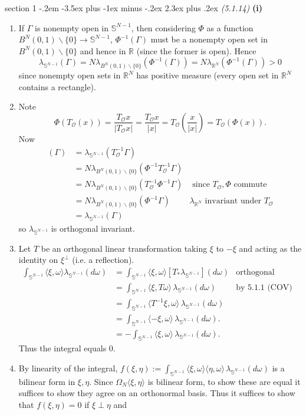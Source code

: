 \documentclass[12pt]{article}
\makeatletter
\theoremstyle{norm}
\newcommand{\bS}[0]{\mathbb{S}}
\newcommand{\sO}[0]{\mathcal{O}}
\newcommand{\R}[0]{\mathbb{R}}
\newcommand{\subeq}[0]{\subseteq}
\newcommand{\Ga}[0]{\Gamma}
\newcommand{\la}[0]{\lambda}
\newcommand{\om}[0]{\omega}
\newcommand{\Om}[0]{\Omega}
\newcommand{\pa}[1]{\left( {#1} \right)}
\newcommand{\an}[1]{\langle {#1}\rangle}
\newcommand{\subprob}[1]{\noindent\textbf{#1}\\}
\newcommand{\pf}[2]{\pa{\frac{#1}{#2}}}
\newcommand{\bs}[0]{\backslash}
\newenvironment{problem}{\@startsection
       {section}
       {1}
       {-.2em}
       {-3.5ex plus -1ex minus -.2ex}
       {2.3ex plus .2ex}
       {\pagebreak[3]%
       \large\bf\noindent{Problem }
       }
       }
       {%
       }
\makeatother
\begin{document}
\begin{problem}{\it (5.1.14)}
\subprob{(i)}
\begin{enumerate}
\item
If $\Ga$ is nonempty open in $\bS^{N-1}$, %
then considering $\Phi$ as a function $B^N(0,1)\bs\{0\}\to \bS^{N-1}$, $\Phi^{-1}(\Ga)$ must be a nonempty open set in $B^N(0,1)\bs\{0\}$ and hence in $\R$ (since the former is open). Hence
\[
\la_{\bS^{N-1}}(\Ga)=N\la_{B^N(0,1)\bs\{0\}}(\Phi^{-1}(\Ga))=N\la_{\R^N}(\Phi^{-1}(\Ga))>0
\]
since nonempty open sets in $\R^N$ has positive measure (every open set in $\R^N$ contains a rectangle).
\item
Note 
\[
\Phi(T_{\sO}(x))=\frac{T_{\sO}x}{|T_{\sO}x|}=\frac{T_{\sO}x}{|x|}=T_{\sO}\pf{x}{|x|}=T_{\sO}(\Phi(x)).
\]
Now
\begin{align*}
[(T_{\sO})_*\la_{\bS^{N-1}}](\Ga)
&=\la_{\bS^{N-1}}(T_{\sO}^{-1}\Ga)\\
&=N\la_{B^N(0,1)\bs\{0\}} (\Phi^{-1}T_{\sO}^{-1}\Ga)\\
&=N\la_{B^N(0,1)\bs\{0\}} (T_{\sO}^{-1}\Phi^{-1}\Ga)&\text{ since }T_{\sO},\Phi\text{ commute}\\
&=N\la_{B^N(0,1)\bs\{0\}}(\Phi^{-1}\Ga)&\la_{\R^N} \text{ invariant under }T_{\sO}\\
&=\la_{\bS^{N-1}}(\Ga)
\end{align*}
so $\la_{\bS^{N-1}}$ is orthogonal invariant.
\item Let $T$ be an orthogonal linear transformation taking $\xi$ to $-\xi$ and acting as the identity on $\xi^{\perp}$ (i.e. a reflection).
\begin{align*}
\int_{\bS^{N-1}} \an{\xi,\om}\la_{\bS^{N-1}}(d\om)
&=\int_{\bS^{N-1}} \an{\xi,\om} [T_* \la_{\bS^{N-1}}](d\om)
&\text{orthogonal invariance}\\
&=\int_{\bS^{N-1}}\an{\xi, T\om} \,\la_{\bS^{N-1}}(d\om)
&\text{by 5.1.1 (COV)}\\
&=\int_{\bS^{N-1}}\an{T^{-1}\xi,\om}\,\la_{\bS^{N-1}}(d\om)\\
&=\int_{\bS^{N-1}} \an{-\xi,\om}\,\la_{\bS^{N-1}}(d\om).\\
&=-\int_{\bS^{N-1}} \an{\xi,\om}\,\la_{\bS^{N-1}}(d\om).
\end{align*}
Thus the integral equals 0.
\item By linearity of the integral, $f(\xi,\eta):=\int_{\bS^{N-1}} \an{\xi,\om}\an{\eta,\om}\,\la_{\bS^{N-1}}(d\om)$ is a bilinear form in $\xi,\eta$. Since $\Om_N\an{\xi,\eta}$ is bilinear form, to show these are equal it suffices to show they agree on an orthonormal basis. Thus it suffices to show that $f(\xi,\eta)=0$ if $\xi\perp \eta$ and

\end{enumerate}
\end{problem}
\end{document}
